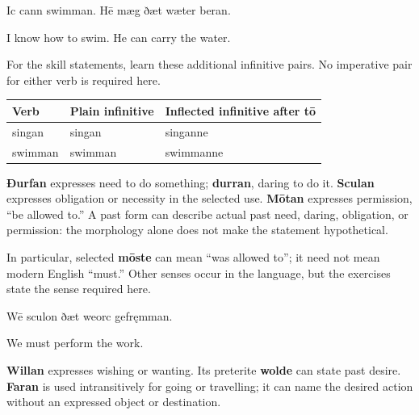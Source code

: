 Ic cann swimman. Hē mæg ðæt wæter beran.

I know how to swim. He can carry the water.

For the skill statements, learn these additional infinitive pairs. No imperative pair for either verb is required here.

\par\begingroup
\fontsize{10.5}{13.2}\selectfont
\setlength{\LTleft}{0pt}\setlength{\LTright}{\fill}
\noindent
\begin{tabular}{@{}>{\raggedright\arraybackslash}p{28.7mm}>{\raggedright\arraybackslash}p{36.45mm}>{\raggedright\arraybackslash}p{53.23mm}@{}}
\toprule
\textbf{Verb} & \textbf{Plain infinitive} & \textbf{Inflected infinitive after tō} \\
\midrule
singan & singan & singanne \\
swimman & swimman & swimmanne \\
\bottomrule
\end{tabular}
\par\endgroup

\textbf{Ðurfan} expresses need to do something; \textbf{durran}, daring to do it. \textbf{Sculan} expresses obligation or necessity in the selected use. \textbf{Mōtan} expresses permission, “be allowed to.” A past form can describe actual past need, daring, obligation, or permission: the morphology alone does not make the statement hypothetical.

In particular, selected \textbf{mōste} can mean “was allowed to”; it need not mean modern English “must.” Other senses occur in the language, but the exercises state the sense required here.

Wē sculon ðæt weorc gefręmman.

We must perform the work.

\textbf{Willan} expresses wishing or wanting. Its preterite \textbf{wolde} can state past desire. \textbf{Faran} is used intransitively for going or travelling; it can name the desired action without an expressed object or destination.


